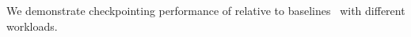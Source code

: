 
We demonstrate checkpointing %
performance of \sys{} relative to baselines~\cite{torch-dcp, megatron-dcp} with different workloads.

